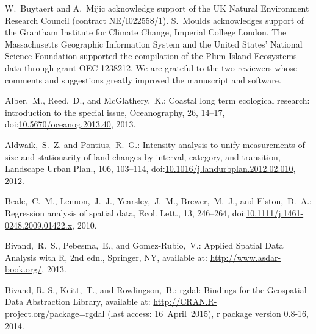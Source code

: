 \documentclass[gmdd, online, hvmath]{copernicus}
\begin{document}


\begin{acknowledgements}
  W.~Buytaert and A.~Mijic acknowledge support of the UK Natural Environment Research
  Council (contract NE/I022558/1). S.~Moulds acknowledges support of the
  Grantham Institute for Climate Change, Imperial College London. The Massachusetts Geographic Information System and the United States’ National Science Foundation supported the compilation of the Plum Island Ecosystems data through grant OEC-1238212. We are grateful to the two reviewers whose comments and suggestions greatly improved the manuscript and software.
\end{acknowledgements}



\begin{thebibliography}{97}

  Alber,~M., Reed,~D., and {McGlathery},~K.: Coastal long term
  ecological research: introduction to the special issue,
  Oceanography, 26, 14--17,
doi:\href{http://dx.doi.org/10.5670/oceanog.2013.40}{10.5670/oceanog.2013.40}, 2013. %


 Aldwaik,~S.~Z. and
  Pontius,~R.~G.: Intensity analysis to unify measurements of size and
  stationarity of land changes by interval, category, and transition,
  Landscape Urban Plan., 106, 103--114,
  doi:\href{http://dx.doi.org/10.1016/j.landurbplan.2012.02.010}{10.1016/j.landurbplan.2012.02.010}, 2012. %


 Beale,~C.~M., Lennon,~J.~J., Yearsley,~J.~M.,
  Brewer,~M.~J., and Elston,~D.~A.: Regression analysis of spatial
  data, Ecol. Lett., 13, 246--264,
  doi:\href{http://dx.doi.org/10.1111/j.1461-0248.2009.01422.x}{10.1111/j.1461-0248.2009.01422.x}, 2010.





 Bivand,~R.~S., Pebesma,~E., and
  Gomez-Rubio,~V.: Applied Spatial Data Analysis with {R}, 2nd edn.,
  Springer, NY, available at: \url{http://www.asdar-book.org/},
  2013.

 Bivand, R. S., Keitt,~T., and Rowlingson,~B.: rgdal:
  Bindings for the Geospatial Data Abstraction Library, available at:
  \url{http://CRAN.R-project.org/package=rgdal} (last
  access: 16~April~2015), r package
  version 0.8-16, 2014.


\end{thebibliography}
\end{document}
